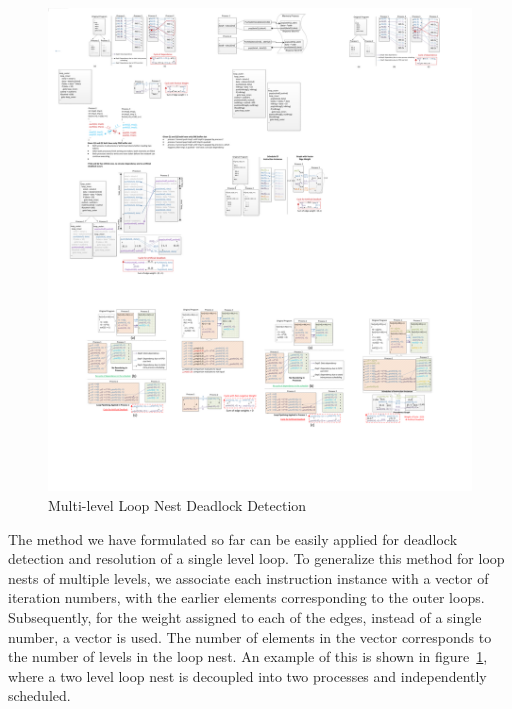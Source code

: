 \begin{figure}[htp]
\begin{center}
\includegraphics[width=0.8\linewidth]{chap4fig/vectorAnnot2.pdf}
\caption{Multi-level Loop Nest Deadlock Detection
\label{fig:vectorannot}}
\end{center}
\end{figure}

The method we have formulated so far can be easily applied for 
deadlock detection and resolution
of a single level loop. To generalize this method for loop nests of multiple
levels, we associate each instruction instance with
a vector of iteration numbers, with the earlier elements corresponding to the outer loops.
Subsequently, for the weight assigned to each of the edges, instead of
a single number, a vector is used. The number of elements in the vector
corresponds to the number of levels in the loop nest.
An example of this is shown in figure~\ref{fig:vectorannot}, where a two 
level loop nest is decoupled into two processes and independently scheduled.



